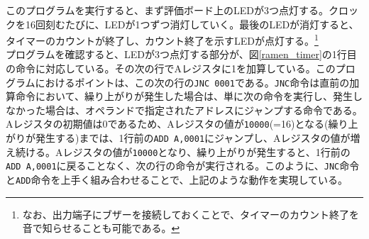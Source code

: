 \documentclass[dvipdfmx,a4j, titlepage]{jsarticle}
\begin{document}
このプログラムを実行すると、まず評価ボード上のLEDが3つ点灯する。クロックを16回刻むたびに、LEDが1つずつ消灯していく。最後のLEDが消灯すると、タイマーのカウントが終了し、カウント終了を示すLEDが点灯する。\footnote{なお、出力端子にブザーを接続しておくことで、タイマーのカウント終了を音で知らせることも可能である。}\\
プログラムを確認すると、LEDが3つ点灯する部分が、図\ref{ramen_timer}の1行目の命令に対応している。その次の行でAレジスタに1を加算している。このプログラムにおけるポイントは、この次の行の\verb|JNC 0001|である。\verb|JNC|命令は直前の加算命令において、繰り上がりが発生した場合は、単に次の命令を実行し、発生しなかった場合は、オペランドで指定されたアドレスにジャンプする命令である。Aレジスタの初期値は0であるため、Aレジスタの値が\verb|10000|(=16)となる(繰り上がりが発生する)までは、1行前の\verb|ADD A,0001|にジャンプし、Aレジスタの値が増え続ける。Aレジスタの値が\verb|10000|となり、繰り上がりが発生すると、1行前の\verb|ADD A,0001|に戻ることなく、次の行の命令が実行される。このように、\verb|JNC|命令と\verb|ADD|命令を上手く組み合わせることで、上記のような動作を実現している。\\
\end{document}

